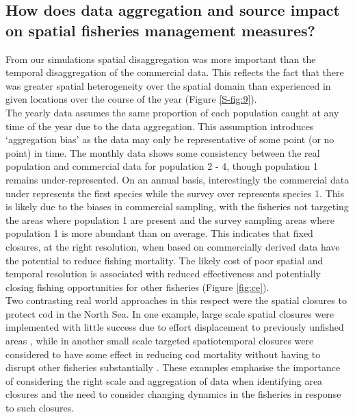 \documentclass[preprint]{elsarticle}
\begin{document}
\subsection{How does data aggregation and source impact on spatial fisheries
	management measures?}

From our simulations spatial disaggregation was more important than the
temporal disaggregation of the commercial data. This reflects the fact that
there was greater spatial heterogeneity over the spatial domain than
experienced in given locations over the course of the year (Figure
\ref{S-fig:9}). \\ 

The yearly data assumes the same proportion of each population caught at any
time of the year due to the data aggregation. This assumption introduces
`aggregation bias' as the data may only be representative of some point (or no
point) in time. The monthly data shows some consistency between the real
population and commercial data for population 2 - 4, though population 1
remains under-represented. On an annual basis, interestingly the commercial
data under represents the first species while the survey over represents
species 1. This is likely due to the biases in commercial sampling, with the
fisheries not targeting the areas where population 1 are present and the survey
sampling areas where population 1 is more abundant than on average. This
indicates that fixed closures, at the right resolution, when based on
commercially derived data have the potential to reduce fishing mortality. The
likely cost of poor spatial and temporal resolution is associated with reduced
effectiveness and potentially closing fishing opportunities for other fisheries
(Figure \ref{fig:ce}). \\

Two contrasting real world approaches in this respect were the spatial closures
to protect cod in the North Sea. In one example, large scale spatial closures
were implemented with little success due to effort displacement to previously
unfished areas \citep{Dinmore2003}, while in another small scale targeted
spatiotemporal closures were considered to have some effect in reducing cod
mortality without having to disrupt other fisheries substantially
\citep{Needle2011}. These examples emphasise the importance of considering the
right scale and aggregation of data when identifying area closures and the need
to consider changing dynamics in the fisheries in response to such closures. \\
\end{document}
